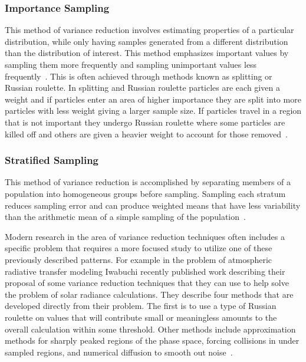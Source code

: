 \subsubsection*{\textbf{Importance Sampling}} This method of variance reduction involves estimating properties of a particular distribution, while only having samples generated from a different distribution than the distribution of interest. This method emphasizes important values by sampling them more frequently and sampling unimportant values less frequently~\cite{wikipediaImportanceSampling}. This is often achieved through methods known as splitting or Russian roulette. In splitting and Russian roulette particles are each given a weight and if particles enter an area of higher importance they are split into more particles with less weight giving a larger sample size. If particles travel in a region that is not important they undergo Russian roulette where some particles are killed off and others are given a heavier weight to account for those removed~\cite{melnik2000rare}.

\subsubsection*{\textbf{Stratified Sampling}} This method of variance reduction is accomplished by separating members of a population into homogeneous groups before sampling. Sampling each stratum reduces sampling error and can produce weighted means that have less variability than the arithmetic mean of a simple sampling of the population~\cite{wikipediaStratifiedSampling}.

Modern research in the area of variance reduction techniques often includes a specific problem that requires a more focused study to utilize one of these previously described patterns.
%
For example in the problem of atmospheric radiative transfer modeling Iwabuchi recently published work describing their proposal of some variance reduction techniques that they can use to help solve the problem of solar radiance calculations.
%
They describe four methods that are developed directly from their problem.
%
The first is to use a type of Russian roulette on values that will contribute small or meaningless amounts to the overall calculation within some threshold.
%
Other methods include approximation methods for sharply peaked regions of the phase space, forcing collisions in under sampled regions, and numerical diffusion to smooth out noise~\cite{iwabuchi2015efficient}.
 